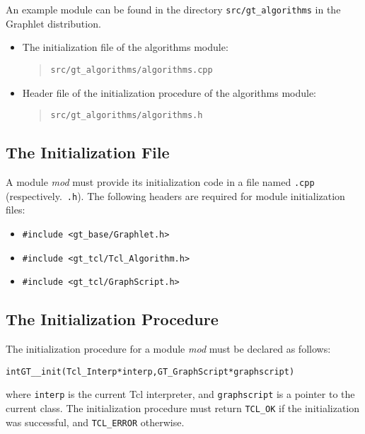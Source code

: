 \documentclass[twoside,fleqn]{report}
\begin{document}
An example module can be found in the directory 
\texttt{src/gt\_algorithms} in the Graphlet distribution.

\begin{itemize}

  \item The initialization file of the algorithms module:
  \begin{quote}
    \texttt{src/gt\_algorithms/algorithms.cpp}
  \end{quote}

  \item Header file of the initialization procedure of the algorithms module:
  \begin{quote}
    \texttt{src/gt\_algorithms/algorithms.h}
  \end{quote}

\end{itemize}



\subsection{The Initialization File}

A module \emph{mod} must provide its initialization code in a file
named \texttt{.cpp} (respectively.\  \texttt{.h}).
The following headers are required for module initialization files:

\begin{itemize}
  \item \verb|#include <gt_base/Graphlet.h>|
  \item \verb|#include <gt_tcl/Tcl_Algorithm.h>|
  \item \verb|#include <gt_tcl/GraphScript.h>|
\end{itemize}

%
%

\subsection{The Initialization Procedure}

The initialization procedure for a module \emph{mod} must be declared 
as follows:

\begin{alltt}
int GT__init (Tcl_Interp* interp, GT_GraphScript* graphscript)
\end{alltt}

where \texttt{interp} is the current Tcl interpreter, and 
\texttt{graphscript} is a pointer to the current \GraphScript{} class.  
The initialization procedure must return \texttt{TCL\_OK} if the 
initialization was successful, and \texttt{TCL\_ERROR} otherwise.
\end{document}
